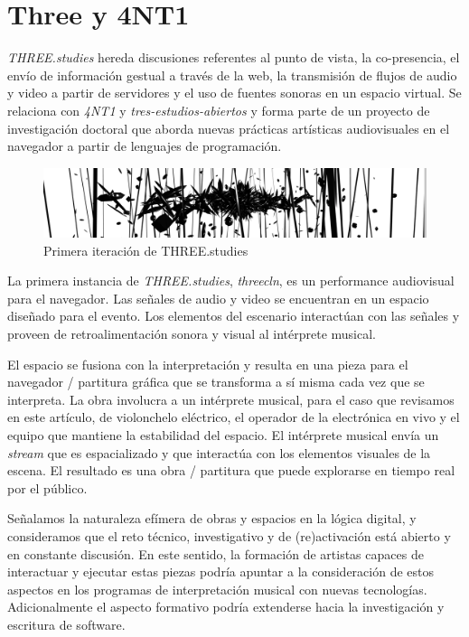 
\section*{Three y 4NT1} %

\textit{THREE.studies} \citep{threestudies} hereda discusiones referentes al punto de vista, la co-presencia, el envío de información gestual a través de la web, la transmisión de flujos de audio y video a partir de servidores y el uso de fuentes sonoras en un espacio virtual. Se relaciona con \textit{4NT1} \citep{anti} y \textit{tres-estudios-abiertos} \citep{tresestudios} y forma parte de un proyecto de investigación doctoral que aborda nuevas prácticas artísticas audiovisuales en el navegador a partir de lenguajes de programación.  

\begin{figure}[H]
  \includegraphics[width=\textwidth]{img/three.png}
  \caption{Primera iteración de THREE.studies}
\end{figure}

La primera instancia de \textit{THREE.studies}, \textit{threecln}, es un performance audiovisual para el navegador. Las señales de audio y video se encuentran en un espacio diseñado para el evento. Los elementos del escenario interactúan con las señales y proveen de retroalimentación sonora y visual al intérprete musical.

El espacio se fusiona con la interpretación y resulta en una pieza para el navegador / partitura gráfica que se transforma a sí misma cada vez que se interpreta. La obra involucra a un intérprete musical, para el caso que revisamos en este artículo, de violonchelo eléctrico, el operador de la electrónica en vivo y el equipo que mantiene la estabilidad del espacio. El intérprete musical envía un \textit{stream} que es espacializado y que interactúa con los elementos visuales de la escena. El resultado es una obra / partitura que puede explorarse en tiempo real por el público. 

\color{MidnightBlue}

Señalamos la naturaleza efímera de obras y espacios en la lógica digital, y consideramos que el reto técnico, investigativo y de (re)activación está abierto y en constante discusión. En este sentido, la formación de artistas capaces de interactuar y ejecutar estas piezas podría apuntar a la consideración de estos aspectos en los programas de interpretación musical con nuevas tecnologías. Adicionalmente el aspecto formativo podría extenderse hacia la investigación y escritura de software.  %

